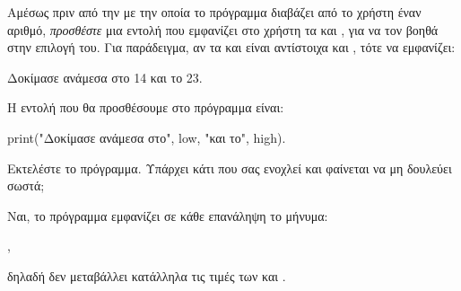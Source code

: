 \documentclass[a4paper,11pt,oneside]{book}
\begin{document}
\begin{step}
Αμέσως πριν από την  με την οποία το πρόγραμμα διαβάζει από το χρήστη έναν αριθμό, \emph{προσθέστε} μια εντολή που εμφανίζει στο χρήστη τα  και , για να τον βοηθά στην επιλογή του. Για παράδειγμα, αν τα  και  είναι αντίστοιχα  και , τότε να εμφανίζει:

\marginnote[24pt]{\iconcomputer}
\begin{pyterm}
Δοκίμασε ανάμεσα στο 14 και το 23.
\end{pyterm}

\begin{answer}
	Η εντολή που θα προσθέσουμε στο πρόγραμμα είναι:
	
	\begin{pynew}
print("Δοκίμασε ανάμεσα στο", low, "και το", high).
	\end{pynew}
\end{answer}

Εκτελέστε το πρόγραμμα. Υπάρχει κάτι που σας ενοχλεί και φαίνεται να μη δουλεύει σωστά;

\begin{answer}
	Ναι, το πρόγραμμα εμφανίζει σε κάθε επανάληψη το μήνυμα:
	
	, 
	
	δηλαδή δεν μεταβάλλει κατάλληλα τις τιμές των  και .
\end{answer}
\end{step}
\end{document}
